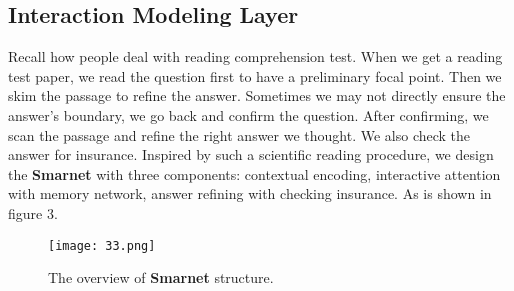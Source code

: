 \documentclass[letterpaper]{article} \usepackage{aaai18}  \usepackage{times}  \usepackage{helvet}  \usepackage{courier}  \usepackage{url}  \usepackage{graphicx}  \usepackage{booktabs}
\begin{document}
 \subsection{Interaction Modeling Layer}
 Recall how people deal with reading comprehension test. When we get a reading test paper, we read the question first to have a preliminary focal point. Then we skim the passage to refine the answer. Sometimes we may not directly ensure the answer's boundary, we go back and confirm the question. After confirming, we scan the passage and refine the right answer we thought. We also check the answer for insurance. Inspired by such a scientific reading procedure, we design the \textbf{Smarnet} with three components: contextual encoding, interactive attention with memory network, answer refining with checking insurance. As is shown in figure 3.
 \begin{figure}[t]
 	\centering
 	\texttt{[image: 33.png]}
 	\caption{The overview of \textbf{Smarnet} structure.}
 \end{figure}
\end{document}
